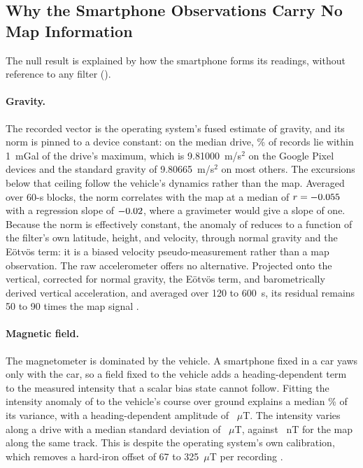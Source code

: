 \subsection{Why the Smartphone Observations Carry No Map Information}
\label{sec:results-cause}

The null result is explained by how the smartphone forms its readings, without reference to any filter ().

\paragraph{Gravity.} The recorded vector is the operating system's fused estimate of gravity, and its norm is pinned to a device constant: on the median drive, \phonegravpinned\% of records lie within 1~mGal of the drive's maximum, which is 9.81000~m/s\(^2\) on the Google Pixel devices and the standard gravity of 9.80665~m/s\(^2\) on most others. The excursions below that ceiling follow the vehicle's dynamics rather than the map. Averaged over 60-s blocks, the norm correlates with the map at a median of \(r = -0.055\) with a regression slope of \(-0.02\), where a gravimeter would give a slope of one. Because the norm is effectively constant, the anomaly of  reduces to a function of the filter's own latitude, height, and velocity, through normal gravity and the E\"{o}tv\"{o}s term: it is a biased velocity pseudo-measurement rather than a map observation. The raw accelerometer offers no alternative. Projected onto the vertical, corrected for normal gravity, the E\"{o}tv\"{o}s term, and barometrically derived vertical acceleration, and averaged over 120 to 600~s, its residual remains 50 to 90 times the map signal \citep{brodovsky2026dissertation}.

\paragraph{Magnetic field.} The magnetometer is dominated by the vehicle. A smartphone fixed in a car yaws only with the car, so a field fixed to the vehicle adds a heading-dependent term to the measured intensity that a scalar bias state cannot follow. Fitting the intensity anomaly of  to the vehicle's course over ground explains a median \phonemagrsq\% of its variance, with a heading-dependent amplitude of \phonemagamplitude~\(\mu\)T. The intensity varies along a drive with a median standard deviation of \phonemagspread~\(\mu\)T, against \phonemagmapsd~nT for the map along the same track. This is despite the operating system's own calibration, which removes a hard-iron offset of 67 to 325~\(\mu\)T per recording \citep{brodovsky2026dissertation}.

